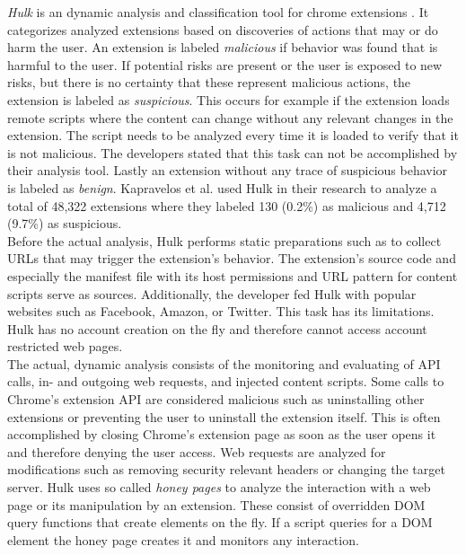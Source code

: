 	\textit{Hulk} is an dynamic analysis and classification tool for chrome extensions \cite{184485}. It categorizes analyzed extensions based on discoveries of actions that may or do harm the user. An extension is labeled \textit{malicious} if behavior was found that is harmful to the user. If potential risks are present or the user is exposed to new risks, but there is no certainty that these represent malicious actions, the extension is labeled as \textit{suspicious}. This occurs for example if the extension loads remote scripts where the content can change without any relevant changes in the extension. The script needs to be analyzed every time it is loaded to verify that it is not malicious. The developers stated that this task can not be accomplished by their analysis tool. Lastly an extension without any trace of suspicious behavior is labeled as \textit{benign}.  Kapravelos et al. used Hulk in their research to analyze a total of 48,322 extensions where they labeled 130 (0.2\%) as malicious and 4,712 (9.7\%) as suspicious. \\
	Before the actual analysis, Hulk performs static preparations such as to collect URLs that may trigger the extension's behavior. The extension's source code and especially the manifest file with its host permissions and URL pattern for content scripts serve as sources. Additionally, the developer fed Hulk with popular websites such as Facebook, Amazon, or Twitter. This task has its limitations. Hulk has no account creation on the fly and therefore cannot access account restricted web pages. \\
	The actual, dynamic analysis consists of the monitoring and evaluating of API calls, in- and outgoing web requests, and injected content scripts. Some calls to Chrome's extension API are considered malicious such as uninstalling other extensions or preventing the user to uninstall the extension itself. This is often accomplished by closing Chrome's extension page as soon as the user opens it and therefore denying the user access. Web requests are analyzed for modifications such as removing security relevant headers or changing the target server. Hulk uses so called \textit{honey pages} to analyze the interaction with a web page or its manipulation by an extension. These consist of overridden DOM query functions that create elements on the fly. If a script queries for a DOM element the honey page creates it and monitors any interaction. 
	
